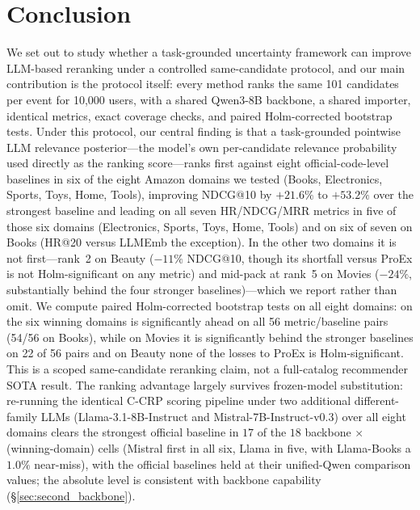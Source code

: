 \section{Conclusion}
\label{sec:conclusion}

We set out to study whether a task-grounded uncertainty framework can improve
LLM-based reranking under a controlled same-candidate protocol, and our main
contribution is the protocol itself: every method ranks the same 101 candidates
per event for 10{,}000 users, with a shared Qwen3-8B backbone, a shared
importer, identical metrics, exact coverage checks, and paired Holm-corrected
bootstrap tests. Under this protocol, our central finding is that a
task-grounded pointwise LLM relevance posterior---the model's own per-candidate
relevance probability used directly as the ranking score---ranks first against
eight official-code-level baselines in six of the eight Amazon domains we tested
(Books, Electronics, Sports, Toys, Home, Tools), improving NDCG@10 by $+21.6\%$
to $+53.2\%$ over the strongest baseline and leading on all seven HR/NDCG/MRR
metrics in five of those six domains (Electronics, Sports, Toys, Home, Tools) and
on six of seven on Books (HR@20 versus LLMEmb the exception). In the other two
domains it is not first---rank~2 on Beauty ($-11\%$ NDCG@10, though its shortfall
versus ProEx is not Holm-significant on any metric) and mid-pack at rank~5 on
Movies ($-24\%$, substantially behind the four stronger baselines)---which we
report rather than omit. We compute paired Holm-corrected bootstrap tests on all
eight domains: on the six winning domains \method{} is significantly ahead on all
56 metric/baseline pairs (54/56 on Books), while on Movies it is significantly
behind the stronger baselines on 22 of 56 pairs and on Beauty none of the losses
to ProEx is Holm-significant. This is a scoped same-candidate reranking claim, not
a full-catalog recommender SOTA result. The ranking advantage largely survives
frozen-model substitution: re-running the identical C-CRP scoring pipeline under
two additional different-family LLMs (Llama-3.1-8B-Instruct and
Mistral-7B-Instruct-v0.3) over all eight domains clears the strongest official
baseline in $17$ of the $18$ backbone$\,\times\,$(winning-domain) cells (Mistral first
in all six, Llama in five, with Llama-Books a $1.0\%$ near-miss), with the
official baselines held at their unified-Qwen comparison values; the absolute
level is consistent with backbone capability (\S\ref{sec:second_backbone}).

